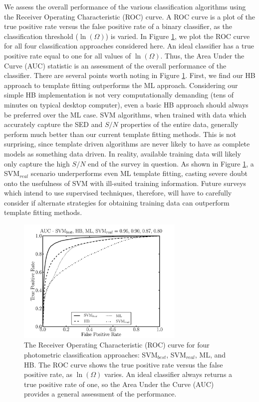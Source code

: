 \documentclass[12pt,preprint]{aastex}
\begin{document}
We assess the overall performance of the various classification
algorithms using the Receiver Operating Characteristic (ROC) curve.  A
ROC curve is a plot of the true positive rate versus the false
positive rate of a binary classifier, as the classification threshold
($\ln(\Omega)$) is varied.  In Figure \ref{fig:roc}, we plot the ROC
curve for all four classification approaches considered here.  An
ideal classifier has a true positive rate equal to one for all values
of $\ln(\Omega)$.  Thus, the Area Under the Curve (AUC) statistic is
an assessment of the overall performance of the classifier.  There are
several points worth noting in Figure \ref{fig:roc}.  First, we find our HB
approach to template fitting outperforms the ML approach.
Considering our simple HB implementation is not very computationally
demanding (tens of minutes on typical desktop computer), even a basic
HB approach should always be preferred over the ML case.  SVM
algorithms, when trained with data which accurately capture the SED
and $S/N$ properties of the entire data, generally perform much better
than our current template fitting methods.  This is not surprising,
since template driven algorithms are never likely to have as complete
models as something data driven.  In reality, available training data will 
likely only capture the high
$S/N$ end of the survey in question.  As shown in Figure \ref{fig:roc},
a SVM$_{real}$ scenario underperforms even ML template fitting, 
casting severe doubt onto the usefulness of SVM with ill-suited
training information.  Future surveys which intend to use supervised 
techniques, therefore, will have to carefully consider if alternate strategies 
for obtaining training data \citep[e.g.,][]{richards12a,richards12b} can 
outperform template fitting methods. 



\begin{figure}
\centering
 \includegraphics[clip=true, trim=0cm 0cm 0.0cm 0.cm,width=8cm]{fig9.pdf}
\caption{The Receiver Operating Characteristic (ROC) curve for four photometric 
classification approaches: SVM$_{best}$, SVM$_{real}$, ML, and HB.  The ROC curve 
shows the true positive rate versus the false positive rate, as $\ln(\Omega)$ varies.  An ideal classifier 
always returns a true positive rate of one, so the Area Under the Curve (AUC) provides a 
general assessment of the performance.}
\label{fig:roc}
\end{figure}
\end{document}
